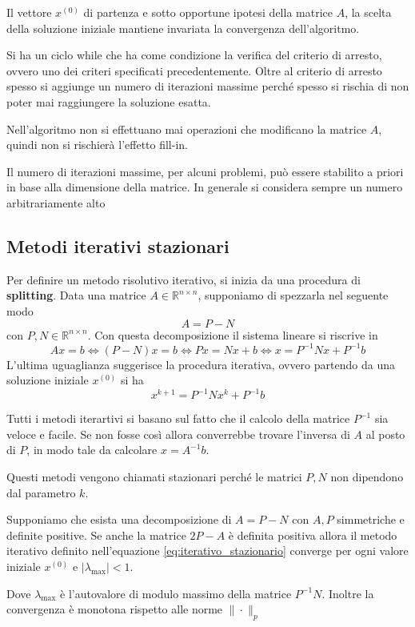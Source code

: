 Il vettore $x^{(0)}$ di partenza e sotto opportune ipotesi della matrice $A$, la
scelta della soluzione iniziale mantiene invariata la convergenza dell'algoritmo.

Si ha un ciclo while che ha come condizione la verifica del criterio di arresto,
ovvero uno dei criteri specificati precedentemente. Oltre al criterio di arresto
spesso si aggiunge un numero di iterazioni massime perché spesso si rischia di
non poter mai raggiungere la soluzione esatta.

Nell'algoritmo non si effettuano mai operazioni che modificano la matrice $A$,
quindi non si rischierà l'effetto fill-in.

\begin{nota}
    Il numero di iterazioni massime, per alcuni problemi, può essere stabilito
    a priori in base alla dimensione della matrice. In generale si considera
    sempre un numero arbitrariamente alto
\end{nota}




\subsection{Metodi iterativi stazionari}
Per definire un metodo risolutivo iterativo, si inizia da una procedura di \textbf{splitting}.
Data una matrice $A\in \mathbb{R}^{n\times n}$, supponiamo di spezzarla nel seguente
modo
$$A=P-N$$
con $P,N\in \mathbb{R}^{n\times n}$. Con questa decomposizione il sistema lineare
si riscrive in
$$Ax= b \iff (P-N)x= b \iff Px = Nx+b \iff x= P^{-1}Nx+P^{-1}b$$
L'ultima uguaglianza suggerisce la procedura iterativa, ovvero partendo da una
soluzione iniziale $x^{(0)}$ si ha
\begin{equation}
    x^{k+1} =  P^{-1}Nx^{k}+P^{-1}b
    \label{eq:iterativo_stazionario}
\end{equation}

Tutti i metodi iterartivi si basano sul fatto che il calcolo della matrice $P^{-1}$
sia veloce e facile. Se non fosse così allora converrebbe trovare l'inversa di
$A$ al posto di $P$, in modo tale da calcolare $x=A^{-1}b$.

Questi metodi vengono chiamati stazionari perché le matrici $P,N$ non dipendono
dal parametro $k$.

\begin{teorema}
    \label{th:metodi_iterativi}
    Supponiamo che esista una decomposizione di $A=P-N $ con $A, P$ simmetriche
    e definite positive. Se anche la matrice $2P-A$ è definita positiva allora
    il metodo iterativo definito nell'equazione \ref{eq:iterativo_stazionario}
    converge per ogni valore iniziale $x^{(0)}$ e $|\lambda_{\max}| < 1$.

    Dove $\lambda_{\max}$ è l'autovalore di modulo massimo della matrice $P^{-1}N$.
    Inoltre la convergenza è monotona rispetto alle norme $\|\cdot\|_p$
\end{teorema}

